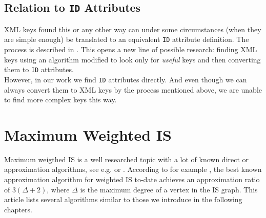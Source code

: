 \subsection{Relation to \texttt{ID} Attributes}

XML keys found this or any other way can under some circumstances (when they are simple enough) be translated to an equivalent \texttt{ID} attribute definition. The process is described in \cite[Ch.\ 9, s.\ 3]{vlist2002xml}. This opens a new line of possible research: finding XML keys using an algorithm modified to look only for \textit{useful} keys and then converting them to \texttt{ID} attributes.\\ 

However, in our work we find \texttt{ID} attributes directly. And even though we can always convert them to XML keys by the process mentioned above, we are unable to find more complex keys this way.\\

\section{Maximum Weighted IS}

Maximum weigthed IS is a well researched topic with a lot of known direct or approximation algorithms, see e.g. \cite{JM1986425} or \cite{Fomin:2009:MCA:1552285.1552286}. According to for example \cite{Paschos:1997:SAO:254180.254190}, the best known approximation algorithm for weighted IS to-date achieves an approximation ratio of $3(\Delta + 2)$, where $\Delta$ is the maximum degree of a vertex in the IS graph. This article lists several algorithms similar to those we introduce in the following chapters.\\